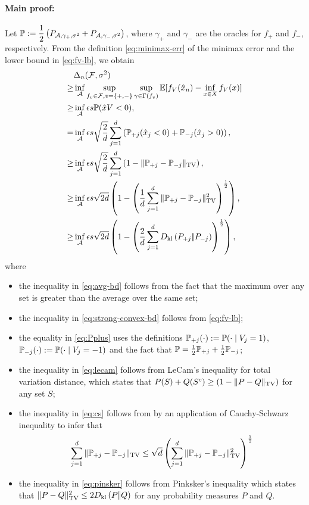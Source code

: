 
\paragraph{Main proof:}
Let $\P:= \dfrac{1}{2} \left(P_{\A, \gamma_+, \sigma^2} + P_{\A, \gamma_-, \sigma^2}\right)$, where $\gamma_+$ and $\gamma_-$ are the oracles for $f_+$ and $f_-$, respectively.
From the definition \eqref{eq:minimax-err} of the minimax error and the lower bound in \eqref{eq:fv-lb}, we obtain
\begin{align}
 &\Delta_n(\F, \sigma^2)\\
  \ge & \inf_{\A} \sup_{f_v \in \F, v=\{+,-\}} \sup_{\gamma \in \Gamma(f_v)} \E[f_V(\hat x_n) - \inf_{x \in X}
  f_V(x)]\label{eq:avg-bd}\\
  \ge & \inf_{\A} \epsilon s  \P(\hat x V < 0), \label{eq:strong-convex-bd}\\
  = & \inf_{\A} \epsilon s \sqrt{\dfrac{2}{d}} \sum_{j=1}^d \left(\P_{+j}(\hat x_j < 0) + \P_{-j}(\hat x_j > 0)\right), \label{eq:Pplus}\\
  \ge &\inf_{\A} \epsilon s \sqrt{\dfrac{2}{d}} \sum_{j=1}^d \left(1 - \tvnorm{\P_{+j}- \P_{-j}}\right), \label{eq:lecam}\\
  \ge &\inf_{\A} \epsilon s \sqrt{2d} \left( 1 - \left(\dfrac{1}d \sum_{j=1}^d \tvnorm{\P_{+j}- \P_{-j}}^2\right)^{\frac{1}{2}}\right), \label{eq:cs}\\
  \ge &\inf_{\A} \epsilon s \sqrt{2d} \left( 1 - \left(\dfrac{2}d \sum_{j=1}^d \dkl{P_{+j}}{P_{-j}}\right)^{\frac{1}{2}}\right), \label{eq:pinsker}
\end{align}
where 
\begin{itemize}
 \item the inequality in \eqref{eq:avg-bd} follows from the fact that the maximum over any set is greater than the average over the same set; 
 \item the inequality in \eqref{eq:strong-convex-bd} follows from \eqref{eq:fv-lb};
 \item the equality in \eqref{eq:Pplus} uses the definitions $\P_{+j}(\cdot) := \P(\cdot\mid V_j=1)$, $\P_{-j}(\cdot) := \P(\cdot\mid V_j=-1)$ and the fact that $\P = \frac{1}{2}\P_{+j} + \frac{1}{2}\P_{-j}$;
 \item the inequality in \eqref{eq:lecam} follows from LeCam's inequality for total variation distance, which states that $P(S) + Q(S^c) \ge \left( 1 - \tvnorm{P-Q}\right)$ for any set $S$;
 \item the inequality in \eqref{eq:cs} follows from by an application of Cauchy-Schwarz inequality to infer that$$\sum_{j=1}^d \tvnorm{\P_{+j}- \P_{-j}} \le \sqrt{d} \left(\sum_{j=1}^d \tvnorm{\P_{+j}- \P_{-j}}^2\right)^{\frac{1}{2}}$$
 \item the inequality in \eqref{eq:pinsker} follows from Pinksker's inequality which states that $\tvnorm{P-Q}^2 \le 2 \dkl{P}{Q}$ for any probability measures $P$ and $Q$.
\end{itemize}



